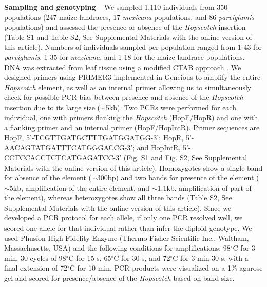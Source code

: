 \documentclass[11pt]{article} %
\begin{document}
\begin{linenumbers}
\begin{flushleft}
\textbf{Sampling and genotyping---}We sampled 1,110 individuals from 350 populations (247 maize landraces, 17 \emph{mexicana} populations, and 86 \emph{parviglumis} populations) and assessed the presence or absence of the \emph{Hopscotch} insertion (Table S1 and Table S2, See Supplemental Materials with the online version of this article). Numbers of individuals sampled per population ranged from 1-43 for \emph{parviglumis}, 1-35 for \emph{mexicana}, and 1-18 for the maize landrace populations. DNA was extracted from leaf tissue using a modified CTAB approach \citep{DoyleDoyle1990, Maloof1984}. We designed primers using PRIMER3 \citep{RozenSkaletsky2000} implemented in Geneious \citep{Kearse2012} to amplify the entire \emph{Hopscotch} element, as well as an internal primer allowing us to simultaneously check for possible PCR bias between presence and absence of the \emph{Hopscotch} insertion due to its large size ($\sim$5kb). Two PCRs were performed for each individual, one with primers flanking the \emph{Hopscotch} (HopF/HopR) and one with a flanking primer and an internal primer (HopF/HopIntR). Primer sequences are HopF, {\small 5'-TCGTTGATGCTTTGATGGATGG-3'}; 
HopR, {\small 5'-AACAGTATGATTTCATGGGACCG-3'}; and HopIntR, {\small  5'-CCTCCACCTCTCATGAGATCC-3'} (Fig. S1 and Fig. S2, See Supplemental Materials with the online version of this article). Homozygotes show a single band for absence of the element ($\sim$300bp) and two bands for presence of the element ($\sim$5kb, amplification of the entire element, and $\sim$1.1kb, amplification of part of the element), whereas heterozygotes show all three bands (Table S2, See Supplemental Materials with the online version of this article). Since we developed a PCR protocol for each allele, if only one PCR resolved well, we scored one allele for that individual rather than infer the diploid genotype. We used Phusion High Fidelity Enzyme (Thermo Fisher Scientific Inc., Waltham, Massachusetts, USA) and the following conditions for amplifications: 98$^{\circ}$C for 3 min, 30 cycles of 98$^{\circ}$C for 15 s, 65$^{\circ}$C for 30 s, and 72$^{\circ}$C for 3 min 30 s, with a final extension of 72$^{\circ}$C for 10 min. PCR products were visualized on a 1\% agarose gel and scored for presence/absence of the \emph{Hopscotch} based on band size.


\end{flushleft}
\end{linenumbers}
\end{document}
